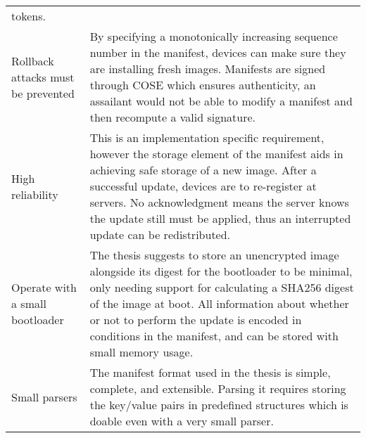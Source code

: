 \begin{longtable}[]{@{}ll@{}}
\begin{minipage}[t]{0.53\columnwidth}
tokens.\strut
\end{minipage}\tabularnewline
\begin{minipage}[t]{0.41\columnwidth}\raggedright\strut
Rollback attacks must be prevented\strut
\end{minipage} & \begin{minipage}[t]{0.53\columnwidth}\raggedright\strut
By specifying a monotonically increasing sequence number in the
manifest, devices can make sure they are installing fresh images.
Manifests are signed through COSE which ensures authenticity, an
assailant would not be able to modify a manifest and then recompute a
valid signature.\strut
\end{minipage}\tabularnewline
\begin{minipage}[t]{0.41\columnwidth}\raggedright\strut
High reliability\strut
\end{minipage} & \begin{minipage}[t]{0.53\columnwidth}\raggedright\strut
This is an implementation specific requirement, however the storage
element of the manifest aids in achieving safe storage of a new image.
After a successful update, devices are to re-register at servers. No
acknowledgment means the server knows the update still must be applied,
thus an interrupted update can be redistributed.\strut
\end{minipage}\tabularnewline
\begin{minipage}[t]{0.41\columnwidth}\raggedright\strut
Operate with a small bootloader\strut
\end{minipage} & \begin{minipage}[t]{0.53\columnwidth}\raggedright\strut
The thesis suggests to store an unencrypted image alongside its digest
for the bootloader to be minimal, only needing support for calculating a
SHA256 digest of the image at boot. All information about whether or not
to perform the update is encoded in conditions in the manifest, and can
be stored with small memory usage.\strut
\end{minipage}\tabularnewline
\begin{minipage}[t]{0.41\columnwidth}\raggedright\strut
Small parsers\strut
\end{minipage} & \begin{minipage}[t]{0.53\columnwidth}\raggedright\strut
The manifest format used in the thesis is simple, complete, and
extensible. Parsing it requires storing the key/value pairs in
predefined structures which is doable even with a very small
parser.\strut
\end{minipage}\tabularnewline

\end{longtable}
